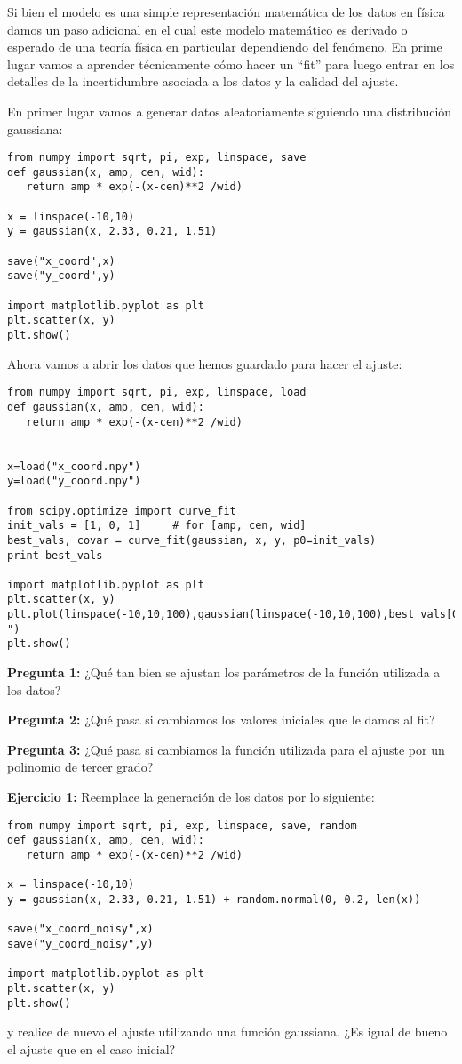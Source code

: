 \documentclass[10.5pt]{article}
\begin{document}
Si bien el modelo es una simple representación matemática de los datos en física damos un paso adicional en el cual este modelo matemático es derivado o esperado de una teoría física en particular dependiendo del fenómeno. En prime lugar vamos a aprender técnicamente cómo hacer un ``fit'' para luego entrar en los detalles de la incertidumbre asociada a los datos y la calidad del ajuste. 

En primer lugar vamos a generar datos aleatoriamente siguiendo una distribución gaussiana:

\begin{verbatim}
from numpy import sqrt, pi, exp, linspace, save
def gaussian(x, amp, cen, wid):
   return amp * exp(-(x-cen)**2 /wid)

x = linspace(-10,10)
y = gaussian(x, 2.33, 0.21, 1.51)

save("x_coord",x)
save("y_coord",y)

import matplotlib.pyplot as plt
plt.scatter(x, y)
plt.show()
\end{verbatim}

Ahora vamos a abrir los datos que hemos guardado para hacer el ajuste:

\begin{verbatim}
from numpy import sqrt, pi, exp, linspace, load
def gaussian(x, amp, cen, wid):
   return amp * exp(-(x-cen)**2 /wid)


x=load("x_coord.npy")
y=load("y_coord.npy")

from scipy.optimize import curve_fit
init_vals = [1, 0, 1]     # for [amp, cen, wid]
best_vals, covar = curve_fit(gaussian, x, y, p0=init_vals)
print best_vals

import matplotlib.pyplot as plt
plt.scatter(x, y)
plt.plot(linspace(-10,10,100),gaussian(linspace(-10,10,100),best_vals[0],best_vals[1],best_vals[2]),"r-")
plt.show()
\end{verbatim}

{\textbf{Pregunta 1:}} ¿Qué tan bien se ajustan los parámetros de la función utilizada a los datos?

{\textbf{Pregunta 2:}} ¿Qué pasa si cambiamos los valores iniciales que le damos al fit?

{\textbf{Pregunta 3:}} ¿Qué pasa si cambiamos la función utilizada para el ajuste por un polinomio de tercer grado?

{\textbf{Ejercicio 1:}} Reemplace la generación de los datos por lo siguiente:

\begin{verbatim}
from numpy import sqrt, pi, exp, linspace, save, random
def gaussian(x, amp, cen, wid):
   return amp * exp(-(x-cen)**2 /wid)

x = linspace(-10,10)
y = gaussian(x, 2.33, 0.21, 1.51) + random.normal(0, 0.2, len(x))

save("x_coord_noisy",x)
save("y_coord_noisy",y)

import matplotlib.pyplot as plt
plt.scatter(x, y)
plt.show()
\end{verbatim}
y realice de nuevo el ajuste utilizando una función gaussiana. ¿Es igual de bueno el ajuste que en el caso inicial?
\end{document}
